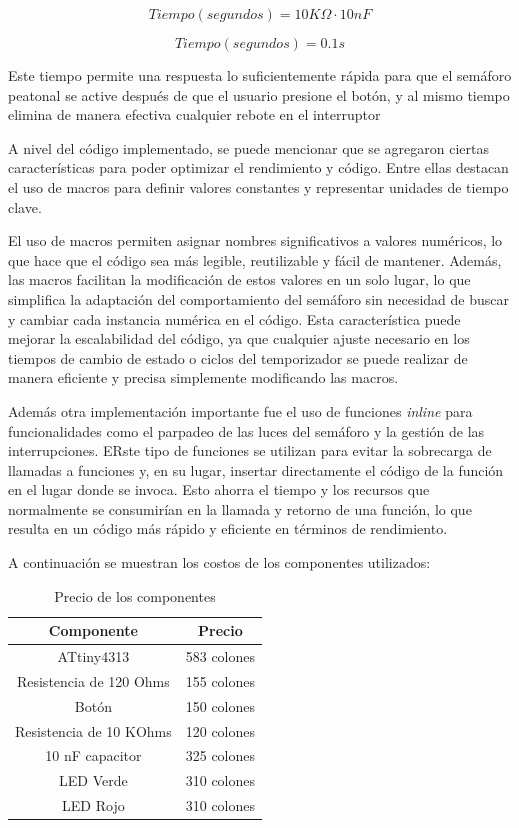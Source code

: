 \begin{equation}
    Tiempo (segundos) = 10 K\Omega \cdot 10 nF
\end{equation}

\begin{equation}
    Tiempo (segundos) = 0.1 s
\end{equation}

Este tiempo permite una respuesta lo suficientemente rápida para que el semáforo peatonal se active después de que el usuario presione el botón, y al mismo tiempo elimina de manera efectiva cualquier rebote en el interruptor

A nivel del código implementado, se puede mencionar que se agregaron ciertas características para poder optimizar el rendimiento y código. Entre ellas destacan el uso de macros para definir valores constantes y representar unidades de tiempo clave.

El uso de macros permiten asignar nombres significativos a valores numéricos, lo que hace que el código sea más legible, reutilizable y fácil de mantener. Además, las macros facilitan la modificación de estos valores en un solo lugar, lo que simplifica la adaptación del comportamiento del semáforo sin necesidad de buscar y cambiar cada instancia numérica en el código. Esta característica puede mejorar la escalabilidad del código, ya que cualquier ajuste necesario en los tiempos de cambio de estado o ciclos del temporizador se puede realizar de manera eficiente y precisa simplemente modificando las macros. 

Además otra implementación importante fue el uso de funciones \textit{inline} para funcionalidades como el parpadeo de las luces del semáforo y la gestión de las interrupciones.  ERste tipo de funciones se utilizan para evitar la sobrecarga de llamadas a funciones y, en su lugar, insertar directamente el código de la función en el lugar donde se invoca. Esto ahorra el tiempo y los recursos que normalmente se consumirían en la llamada y retorno de una función, lo que resulta en un código más rápido y eficiente en términos de rendimiento. \cite{microsoftInlineFunctions}

A continuación se muestran los costos de los componentes utilizados:

\begin{table}[h]
\centering
\begin{tabular}{|c|c|}
\hline
\textbf{Componente}     & \textbf{Precio} \\ \hline
ATtiny4313               & 583 colones    \\ \hline
Resistencia de 120 Ohms & 155 colones     \\ \hline
Botón                   & 150 colones     \\ \hline
Resistencia de 10 KOhms & 120 colones     \\ \hline
10 nF capacitor        & 325 colones     \\ \hline
LED Verde              & 310 colones     \\ \hline
LED Rojo              & 310 colones     \\ \hline
\end{tabular}
\caption{Precio de los componentes}
\label{tab:componentes}
\end{table}

